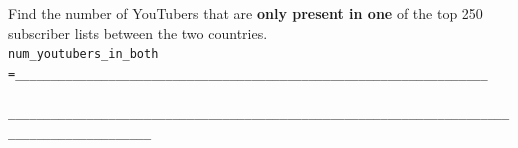 \begin{enumerate}
 Find the number of YouTubers that are \textbf{only present in one} of the top 250 subscriber lists between the two countries. \\

\lstinline{num_youtubers_in_both =__________________________________________________________________} \\ \\
\lstinline{__________________________________________________________________________________________} \\ \\
\end{enumerate}
